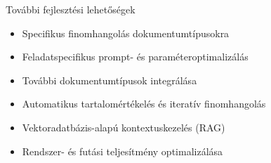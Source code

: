 \documentclass[aspectratio=169, 11pt]{beamer}
\begin{document}
\begin{frame}{További fejlesztési lehetőségek}
    \vspace{-1em}
    \begin{itemize}
        \vspace{1.5em}
        \item[\faCogs] Specifikus finomhangolás dokumentumtípusokra
        \vspace{1.5em}
        \item[\faSlidersH] Feladatspecifikus prompt- és paraméteroptimalizálás
        \vspace{1.5em}
        \item[\faFile] További dokumentumtípusok integrálása
        \vspace{1.5em}
        \item[\faCheckCircle] Automatikus tartalomértékelés és iteratív finomhangolás
        \vspace{1.5em}
        \item[\faDatabase] Vektoradatbázis-alapú kontextuskezelés (\textsc{RAG})
        \vspace{1.5em}
        \item[\faTools] Rendszer- és futási teljesítmény optimalizálása
    \end{itemize}
\end{frame}
\end{document}
